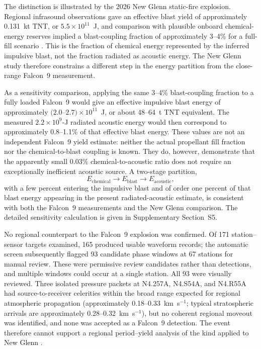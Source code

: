 \documentclass[]{seismica}
\begin{document}
The distinction is illustrated by the 2026 New Glenn static-fire explosion.
Regional infrasound observations gave an effective blast yield of approximately
0.131~kt TNT, or $5.5\times10^{11}$~J, and comparison with plausible onboard
chemical-energy reserves implied a blast-coupling fraction of approximately
3--4\% for a full-fill scenario
\citep{silber_scamfer_newglenn_2026}. This is the fraction of chemical energy
represented by the inferred impulsive blast, not the fraction radiated as
acoustic energy. The New Glenn study therefore constrains a different step in
the energy partition from the close-range Falcon~9 measurement.

As a sensitivity comparison, applying the same 3--4\% blast-coupling fraction
to a fully loaded Falcon~9 would give an effective impulsive blast energy of
approximately $(2.0$--$2.7)\times10^{11}$~J, or about 48--64~t TNT
equivalent. The measured $2.2\times10^9$-J radiated acoustic energy would then
correspond to approximately 0.8--1.1\% of that effective blast energy. These
values are not an independent Falcon~9 yield estimate: neither the actual
propellant fill fraction nor the chemical-to-blast coupling is known. They do,
however, demonstrate that the apparently small 0.03\% chemical-to-acoustic
ratio does not require an exceptionally inefficient acoustic source. A
two-stage partition,
\[
 E_{\mathrm{chemical}}
 \rightarrow E_{\mathrm{blast}}
 \rightarrow E_{\mathrm{acoustic}},
\]
with a few percent entering the impulsive blast and of order one percent of
that blast energy appearing in the present radiated-acoustic estimate, is
consistent with both the Falcon~9 measurements and the New Glenn comparison.
The detailed sensitivity calculation is given in Supplementary Section~S5.

No regional counterpart to the Falcon~9 explosion was confirmed. Of 171
station--sensor targets examined, 165 produced usable waveform records; the
automatic screen subsequently flagged 93 candidate phase windows at 67
stations for manual review. These were permissive review candidates rather
than detections, and multiple windows could occur at a single station. All 93
were visually reviewed. Three isolated pressure packets at N4.257A, N4.S54A,
and N4.R55A had source-to-receiver celerities within the broad range expected
for regional atmospheric propagation (approximately 0.18--0.33~km~s$^{-1}$;
typical stratospheric arrivals are approximately 0.28--0.32~km~s$^{-1}$),
but no coherent regional moveout was identified, and none was accepted as a
Falcon~9 detection. The event therefore cannot support a regional
period--yield analysis of the kind applied to New Glenn
\citep{silber_scamfer_newglenn_2026}.
\end{document}
